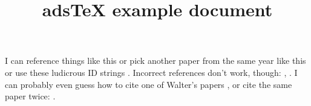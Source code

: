 \documentclass[10pt,a4paper]{article}
\begin{document}
\title{adsTeX example document}
\maketitle
I can reference things like this \cite{THands2014MNRAS} or pick another paper from the same year like this \cite{THands2014IAUS} or use these ludicrous ID strings \citep{2014MNRAS.445.2285D}. Incorrect references don't work, though: \cite{MBlobbyNEdmonds1990}, \cite{3123MNRAS.123.123D}. I can probably even guess how to cite one of Walter's papers \citep{WDehnen2000MNRAS}, or cite the same paper twice: \cite{THands2014MNRAS}.

\end{document}
